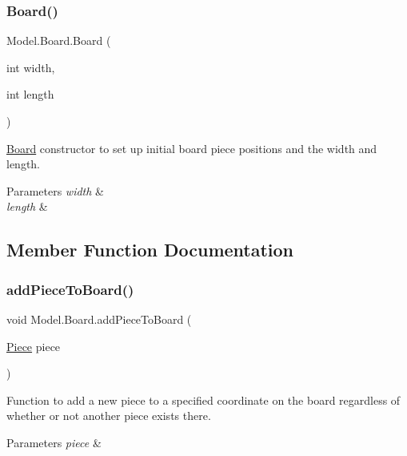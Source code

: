 \subsubsection{\texorpdfstring{Board()}{Board()}}
{\footnotesize\ttfamily Model.\+Board.\+Board (\begin{DoxyParamCaption}\item[{int}]{width,  }\item[{int}]{length }\end{DoxyParamCaption})}

\hyperlink{class_model_1_1_board}{Board} constructor to set up initial board piece positions and the width and length. 
\begin{DoxyParams}{Parameters}
{\em width} & \\
\hline
{\em length} & \\
\hline
\end{DoxyParams}


\subsection{Member Function Documentation}
\hypertarget{class_model_1_1_board_aabff4443881dcd377b3a51b06ef5a757}{}\label{class_model_1_1_board_aabff4443881dcd377b3a51b06ef5a757} 
\subsubsection{\texorpdfstring{add\+Piece\+To\+Board()}{addPieceToBoard()}}
{\footnotesize\ttfamily void Model.\+Board.\+add\+Piece\+To\+Board (\begin{DoxyParamCaption}\item[{\hyperlink{class_model_1_1_pieces_1_1_piece}{Piece}}]{piece }\end{DoxyParamCaption})}

Function to add a new piece to a specified coordinate on the board regardless of whether or not another piece exists there. 
\begin{DoxyParams}{Parameters}
{\em piece} & \\
\hline
\end{DoxyParams}
\hypertarget{class_model_1_1_board_a16886f1ae73fae80ffbd439cda934e8a}{}\label{class_model_1_1_board_a16886f1ae73fae80ffbd439cda934e8a} 
